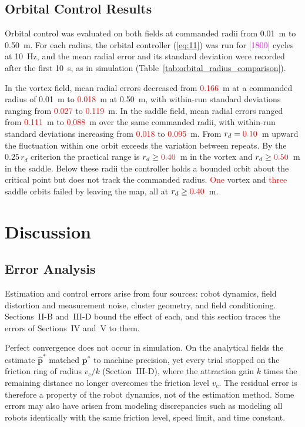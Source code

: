 \documentclass[lettersize,journal]{IEEEtran}
\newcommand{\syn}[1]{\textcolor{red}{#1}}
\newcommand{\open}[1]{\textcolor{magenta}{[#1]}}
\begin{document}
\subsection{Orbital Control Results}

Orbital control was evaluated on both fields at commanded radii from 0.01~m to 0.50~m. For each radius, the orbital controller (\ref{eq:11}) was run for \open{1800} cycles at 10~Hz, and the mean radial error and its standard deviation were recorded after the first 10~s, as in simulation (Table~\ref{tab:orbital_radius_comparison}).

 In the vortex field, mean radial errors decreased from \syn{0.166}~m at a commanded radius of 0.01~m to \syn{0.018}~m at 0.50~m, with within-run standard deviations ranging from \syn{0.027} to \syn{0.119}~m. In the saddle field, mean radial errors ranged from \syn{0.111}~m to \syn{0.088}~m over the same commanded radii, with within-run standard deviations increasing from \syn{0.018} to \syn{0.095}~m. From $r_d = \syn{0.10}$~m upward the fluctuation within one orbit exceeds the variation between repeats. By the $0.25\,r_d$ criterion the practical range is $r_d \ge \syn{0.40}$~m in the vortex and $r_d \ge \syn{0.50}$~m in the saddle. Below these radii the controller holds a bounded orbit about the critical point but does not track the commanded radius. \syn{One} vortex and \syn{three} saddle orbits failed by leaving the map, all at $r_d \ge \syn{0.40}$~m.




\section{Discussion}

\subsection{Error Analysis}

Estimation and control errors arise from four sources: robot dynamics, field distortion and measurement noise, cluster geometry, and field conditioning. Sections~II-B and~III-D bound the effect of each, and this section traces the errors of Sections~IV and~V to them.

Perfect convergence does not occur in simulation. On the analytical fields the estimate $\hat{\mathbf{p}}^*$ matched $\mathbf{p}^*$ to machine precision, yet every trial stopped on the friction ring of radius $v_c/k$ (Section~III-D), where the attraction gain $k$ times the remaining distance no longer overcomes the friction level $v_c$. The residual error is therefore a property of the robot dynamics, not of the estimation method. Some errors may also have arisen from modeling discrepancies such as modeling all robots identically with the same friction level, speed limit, and time constant.
\end{document}
